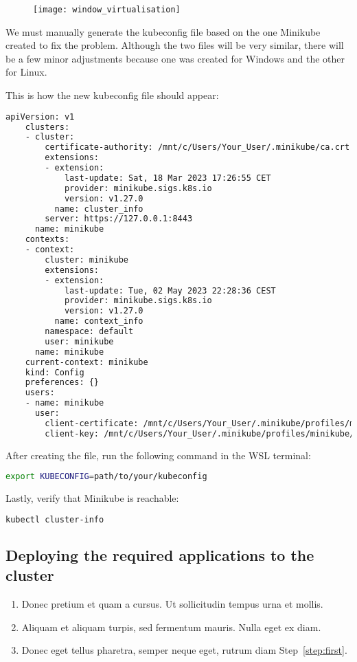 \begin{figure}[H]
	\centering
	\texttt{[image: window\_virtualisation]}
	\label{fig:window_virtualisation}
\end{figure}

We must manually generate the kubeconfig file based on the one Minikube created to fix the problem. Although the two files will be very similar, there will be a few minor adjustments because one was created for Windows and the other for Linux.

This is how the new kubeconfig file should appear:

\begin{lstlisting}[language=bash]
	apiVersion: v1
	clusters:
	- cluster:
		certificate-authority: /mnt/c/Users/Your_User/.minikube/ca.crt
		extensions:
		- extension:
			last-update: Sat, 18 Mar 2023 17:26:55 CET
			provider: minikube.sigs.k8s.io
			version: v1.27.0
		  name: cluster_info
		server: https://127.0.0.1:8443
	  name: minikube
	contexts:
	- context:
		cluster: minikube
		extensions:
		- extension:
			last-update: Tue, 02 May 2023 22:28:36 CEST
			provider: minikube.sigs.k8s.io
			version: v1.27.0
		  name: context_info
		namespace: default
		user: minikube
	  name: minikube
	current-context: minikube
	kind: Config
	preferences: {}
	users:
	- name: minikube
	  user:
		client-certificate: /mnt/c/Users/Your_User/.minikube/profiles/minikube/client.crt
		client-key: /mnt/c/Users/Your_User/.minikube/profiles/minikube/client.key
\end{lstlisting}

After creating the file, run the following command in the WSL terminal:
\begin{lstlisting}[language=bash]
	export KUBECONFIG=path/to/your/kubeconfig
\end{lstlisting}

Lastly, verify that Minikube is reachable:
\begin{lstlisting}[language=bash]
	kubectl cluster-info
\end{lstlisting}

\subsection{Deploying the required applications to the cluster}




\begin{enumerate}
	\item\label{step:first} Donec pretium et quam a cursus. Ut sollicitudin tempus urna et mollis.
	\item Aliquam et aliquam turpis, sed fermentum mauris. Nulla eget ex diam.
	\item Donec eget tellus pharetra, semper neque eget, rutrum diam Step~\ref{step:first}.
\end{enumerate}

